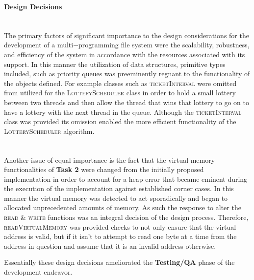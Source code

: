 \documentclass[12pt]{article}
\begin{document}
{\setlength{\parindent}{0cm}
\textbf{Design Decisions}
\\\\ \paragraph{}The primary factors of significant importance to the design considerations for the development of a multi$-$programming file system were the scalability, robustness, and efficiency of the system in accordance with the resources 
  associated with its support. In this manner the utilization of data structures, primitive types included, such as priority queues was 
  preeminently regnant to the functionality of the objects defined. For example classes such as \textsc{ticketInterval} were omitted from utilized 
  for the \textsc{LotteryScheduler} class in order to hold a small lottery between two threads and then allow the thread that wins that lottery to go on to have a lottery with the next thread in the queue. 
  Although the \textsc{ticketInterval} class was provided its omission enabled the more efficient functionality of the \textsc{LotteryScheduler} algorithm.
  \\\\
  \paragraph{}Another issue of equal importance is the fact that the virtual memory functionalities of \textbf{Task 2} were changed from the initially proposed implementation
  in order to account for a heap error that became eminent during the execution of the implementation against established corner cases. In this manner the virtual memory was detected to act sporadically and began to allocated
  unprecedented amounts of memory. As such the response to alter the \textsc{read} $\&$ \textsc{write} functions was an integral decision of the design
  process. Therefore, \textsc{readVirtualMemory} was provided checks to not only ensure that the virtual address is valid, but if it isn't to attempt to read one byte at a time from the address in question and assume that it is an invalid address otherwise.
\begin{center}Essentially these design decisions ameliorated the \textbf{Testing/QA} phase of the development endeavor.\end{center}
}
\end{document}
